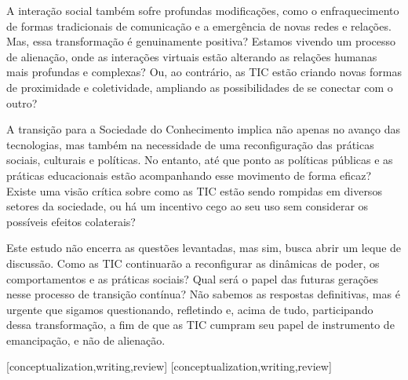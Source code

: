 \documentclass[portuguese]{textolivre}
\begin{document}
A interação social também sofre profundas modificações, como o
enfraquecimento de formas tradicionais de comunicação e a emergência de
novas redes e relações. Mas, essa transformação é genuinamente positiva?
Estamos vivendo um processo de alienação, onde as interações virtuais
estão alterando as relações humanas mais profundas e complexas? Ou, ao
contrário, as TIC estão criando novas formas de proximidade e
coletividade, ampliando as possibilidades de se conectar com o outro?

A transição para a Sociedade do Conhecimento implica não apenas no
avanço das tecnologias, mas também na necessidade de uma reconfiguração
das práticas sociais, culturais e políticas. No entanto, até que ponto
as políticas públicas e as práticas educacionais estão acompanhando esse
movimento de forma eficaz? Existe uma visão crítica sobre como as TIC
estão sendo rompidas em diversos setores da sociedade, ou há um
incentivo cego ao seu uso sem considerar os possíveis efeitos
colaterais?

Este estudo não encerra as questões levantadas, mas sim, busca abrir um
leque de discussão. Como as TIC continuarão a reconfigurar as dinâmicas
de poder, os comportamentos e as práticas sociais? Qual será o papel das
futuras gerações nesse processo de transição contínua? Não sabemos as
respostas definitivas, mas é urgente que sigamos questionando,
refletindo e, acima de tudo, participando dessa transformação, a fim de
que as TIC cumpram seu papel de instrumento de emancipação, e não de
alienação.




\printbibliography\label{sec-bib}


\begin{contributors}
[conceptualization,writing,review]
[conceptualization,writing,review]
\end{contributors}
\end{document}

